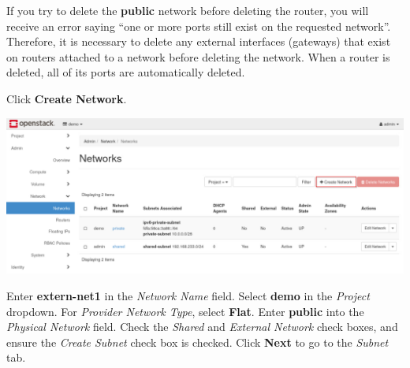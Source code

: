 \documentclass[letterpaper, 12pt]{article}
\begin{document}
\begin{enumerate}
    \begin{notebox}
        If you try to delete the \textbf{public} network before deleting the router, you will receive an error saying ``one or more ports still exist on the requested network''.
        Therefore, it is necessary to delete any external interfaces (gateways) that exist on routers attached to a network before deleting the network.
        When a router is deleted, all of its ports are automatically deleted.
    \end{notebox}

    \begin{labstep}
        Click \textbf{Create Network}.

        \begin{center}
            \includegraphics[width=\linewidth]{images/part1/step6.png}
        \end{center}
    \end{labstep}

    \begin{labstep}
        Enter \textbf{extern-net1} in the \textit{Network Name} field.
        Select \textbf{demo} in the \textit{Project} dropdown.
        For \textit{Provider Network Type}, select \textbf{Flat}.
        Enter \textbf{public} into the \textit{Physical Network} field.
        Check the \textit{Shared} and \textit{External Network} check boxes, and ensure the \textit{Create Subnet} check box is checked.
        Click \textbf{Next} to go to the \textit{Subnet} tab.


\end{labstep}
\end{enumerate}
\end{document}
